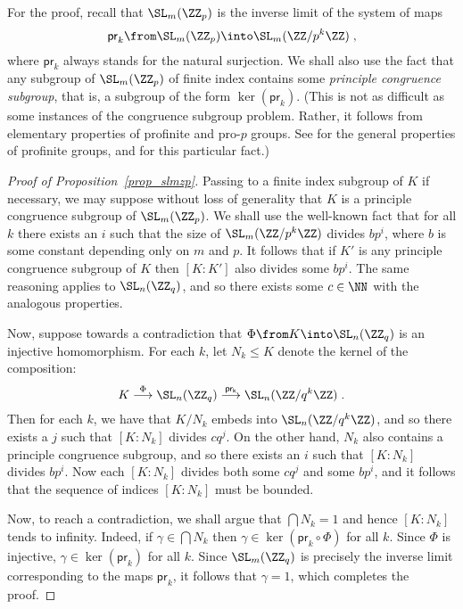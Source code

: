 \documentclass[oneside,leqno,11pt]{amsart}
\begin{document}
For the proof, recall that $\SL_m(\ZZ_p)$ is the inverse limit of the
system of maps
\[\mathsf{pr}_k\from\SL_m(\ZZ_p)\into\SL_m(\ZZ/p^k\ZZ)\;,
\]
where $\mathsf{pr}_k$ always stands for the natural surjection.  We
shall also use the fact that any subgroup of $\SL_m(\ZZ_p)$ of finite
index contains some \emph{principle congruence subgroup}, that is, a
subgroup of the form $\ker(\mathsf{pr}_k)$.  (This is not as difficult
as some instances of the congruence subgroup problem.  Rather, it
follows from elementary properties of profinite and pro-$p$ groups.
See \cite{wilson} for the general properties of profinite groups, and
\cite[Exercise~1.9]{pro-p} for this particular fact.)

\begin{proof}[Proof of Proposition~\ref{prop_slmzp}]
  Passing to a finite index subgroup of $K$ if necessary, we may
  suppose without loss of generality that $K$ is a principle
  congruence subgroup of $\SL_m(\ZZ_p)$.  We shall use the well-known
  fact that for all $k$ there exists an $i$ such that the size of
  $\SL_m(\ZZ/p^k\ZZ)$ divides $bp^i$, where $b$ is some constant
  depending only on $m$ and $p$.  It follows that if $K'$ is any
  principle congruence subgroup of $K$ then $[K:K']$ also divides some
  $bp^i$.  The same reasoning applies to $\SL_n(\ZZ_q)$, and so there
  exists some $c\in\NN$ with the analogous properties.

  Now, suppose towards a contradiction that
  $\Phi\from K\into\SL_n(\ZZ_q)$ is an injective homomorphism.  For
  each $k$, let $N_k\leq K$ denote the kernel of the composition:
  \[K\stackrel{\Phi}{\longrightarrow}\SL_n(\ZZ_q)
  \stackrel{\mathsf{pr_k}}{\longrightarrow}\SL_n(\ZZ/q^k\ZZ)\;.
  \]
  Then for each $k$, we have that $K/N_k$ embeds into
  $\SL_n(\ZZ/q^k\ZZ)$, and so there exists a $j$ such that $[K:N_k]$
  divides $cq^j$.  On the other hand, $N_k$ also contains a principle
  congruence subgroup, and so there exists an $i$ such that $[K:N_k]$
  divides $bp^i$.  Now each $[K:N_k]$ divides both some $cq^j$ and
  some $bp^i$, and it follows that the sequence of indices $[K:N_k]$
  must be bounded.

  Now, to reach a contradiction, we shall argue that $\bigcap N_k=1$
  and hence $[K:N_k]$ tends to infinity.  Indeed, if $\gamma\in\bigcap
  N_k$ then $\gamma\in\ker(\mathsf{pr}_k\circ\Phi)$ for all $k$.
  Since $\Phi$ is injective, $\gamma\in\ker(\mathsf{pr}_k)$ for all
  $k$.  Since $\SL_m(\ZZ_q)$ is precisely the inverse limit
  corresponding to the maps $\mathsf{pr}_k$, it follows that
  $\gamma=1$, which completes the proof.
\end{proof}
\end{document}
